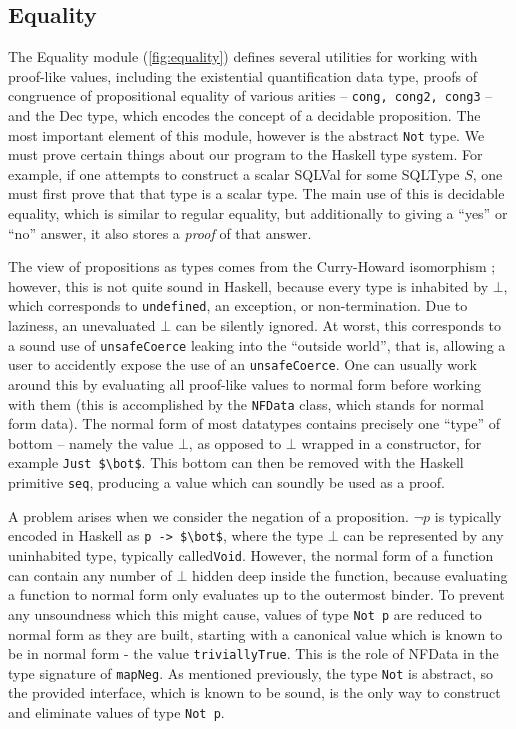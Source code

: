 \subsection{Equality}

The Equality module (\ref{fig:equality}) defines several 
utilities for working
with proof-like values, including the existential 
quantification data type,
proofs of congruence of propositional equality of various 
arities -- \lstinline{cong, cong2, cong3} -- and the Dec type, which 
encodes the concept of
a decidable proposition. The most important element of this 
module, however is
the abstract \lstinline{Not} type. We must prove certain 
things about our
program to the Haskell type system. For example, if one 
attempts to construct a
scalar SQLVal for some SQLType $S$, one must first prove 
that that type is a
scalar type. The main use of this is decidable equality, 
which is similar to
regular equality, but additionally to giving a ``yes'' or 
``no'' answer, it also
stores a \emph{proof} of that answer.

The view of propositions as types comes from the 
Curry-Howard
isomorphism \cite{props}; however, this is not quite sound 
in Haskell, because
every type is inhabited by $\bot$, which corresponds to 
\texttt{undefined}, an
exception, or non-termination. Due to laziness, an 
unevaluated $\bot$ can be
silently ignored. At worst, this corresponds to a sound use 
of
\lstinline{unsafeCoerce} leaking into the ``outside 
world'', that is, allowing
a user to accidently expose the use of an 
\lstinline{unsafeCoerce}. One can
usually work around this by evaluating all proof-like 
values to normal form
before working with them (this is accomplished by the 
\lstinline{NFData} class,
which stands for normal form data). The normal form of most 
datatypes contains
precisely one ``type'' of bottom -- namely the value 
$\bot$, as opposed to
$\bot$ wrapped in a constructor, for example 
\lstinline{Just $\bot$}. This
bottom can then be removed with the Haskell primitive 
\lstinline{seq},
producing a value which can soundly be used as a proof.

A problem arises when we consider the negation of a proposition. $\lnot p$ 
is typically encoded in Haskell as \lstinline{p -> $\bot$}, where the type 
$\bot$
can be represented by any uninhabited type, typically called\lstinline{Void}. 
However, the normal form of a function can contain any number of $\bot$ hidden 
deep inside the function, because evaluating a function to normal form only 
evaluates up to the outermost binder.  To prevent any
unsoundness which this might cause, values of type \lstinline{Not p} are reduced
to normal form as they are built, starting with a canonical value which is known
to be in normal form - the value \lstinline{triviallyTrue}.  This is the role of
NFData in the type signature of \lstinline{mapNeg}.  As mentioned previously,
the type \lstinline{Not} is abstract, so the provided interface, which is known
to be sound, is the only way to construct and eliminate values of type
\lstinline{Not p}.


